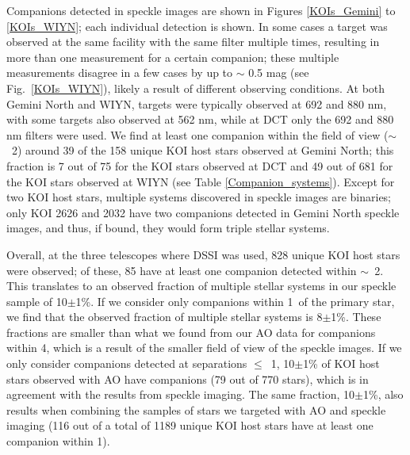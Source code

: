 \documentclass[twocolumn,appendixfloats]{aastex6}
\begin{document}
Companions detected in speckle images are shown in Figures \ref{KOIs_Gemini} 
to \ref{KOIs_WIYN}; each individual detection is shown. In some cases 
a target was observed at the same facility with the same filter multiple times, 
resulting in more than one measurement for a certain companion; these multiple
measurements disagree in a few cases by up to $\sim$ 0.5 mag (see Fig.\
\ref{KOIs_WIYN}), likely a result of different observing conditions. At both Gemini 
North and WIYN, targets were typically observed at 692 and 880 nm, with some
targets also observed at 562 nm, while at DCT only the 692 and 880 nm filters
were used. We find at least one companion within the field of view ($\sim$~2\arcsec) 
around 39 of the 158 unique KOI host stars observed at Gemini North; this fraction 
is 7 out of 75 for the KOI stars observed at DCT and 49 out of 681 for the KOI 
stars observed at WIYN (see Table \ref{Companion_systems}). 
Except for two KOI host stars, multiple systems discovered in speckle images are 
binaries; only KOI 2626 and 2032 have two companions detected in Gemini North 
speckle images, and thus, if bound, they would form triple stellar systems.

Overall, at the three telescopes where DSSI was used, 828 unique KOI host stars 
were observed; of these, 85 have at least one companion detected within 
$\sim$~2\arcsec. This translates to an observed  fraction of multiple stellar 
systems in our speckle sample of 10$\pm$1\%. If we consider only companions 
within 1\arcsec\ of the primary star, we find that the observed fraction of multiple 
stellar systems is 8$\pm$1\%. These fractions are smaller than what we found from 
our AO data for companions within 4\arcsec, which is a result of the smaller field of 
view of the speckle images. If we only consider companions detected at separations 
$\leq$~1\arcsec, 10$\pm$1\% of KOI host stars observed with AO have companions 
(79 out of 770 stars), which is in agreement with the results from speckle imaging. 
The same fraction, 10$\pm$1\%, also results when combining the samples of stars 
we targeted with AO and speckle imaging (116 out of a total of 1189 unique KOI 
host stars have at least one companion within 1\arcsec).
\end{document}
